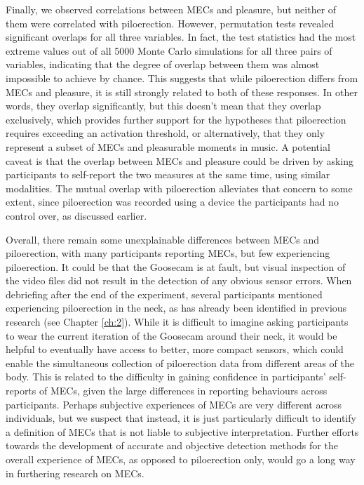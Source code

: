 Finally, we observed correlations between MECs and pleasure, but neither of them were correlated with piloerection. However, permutation tests revealed significant overlaps for all three variables. In fact, the test statistics had the most extreme values out of all 5000 Monte Carlo simulations for all three pairs of variables, indicating that the degree of overlap between them was almost impossible to achieve by chance. This suggests that while piloerection differs from MECs and pleasure, it is still strongly related to both of these responses. In other words, they overlap significantly, but this doesn't mean that they overlap exclusively, which provides further support for the hypotheses that piloerection requires exceeding an activation threshold, or alternatively, that they only represent a subset of MECs and pleasurable moments in music. A potential caveat is that the overlap between MECs and pleasure could be driven by asking participants to self-report the two measures at the same time, using similar modalities. The mutual overlap with piloerection alleviates that concern to some extent, since piloerection was recorded using a device the participants had no control over, as discussed earlier.

Overall, there remain some unexplainable differences between MECs and piloerection, with many participants reporting MECs, but few experiencing piloerection. It could be that the Goosecam is at fault, but visual inspection of the video files did not result in the detection of any obvious sensor errors. When debriefing after the end of the experiment, several participants mentioned experiencing piloerection in the neck, as has already been identified in previous research (see Chapter \ref{ch:2}). While it is difficult to imagine asking participants to wear the current iteration of the Goosecam around their neck, it would be helpful to eventually have access to better, more compact sensors, which could enable the simultaneous collection of piloerection data from different areas of the body. This is related to the difficulty in gaining confidence in participants' self-reports of MECs, given the large differences in reporting behaviours across participants. Perhaps subjective experiences of MECs are very different across individuals, but we suspect that instead, it is just particularly difficult to identify a definition of MECs that is not liable to subjective interpretation. Further efforts towards the development of accurate and objective detection methods for the overall experience of MECs, as opposed to piloerection only, would go a long way in furthering research on MECs.

